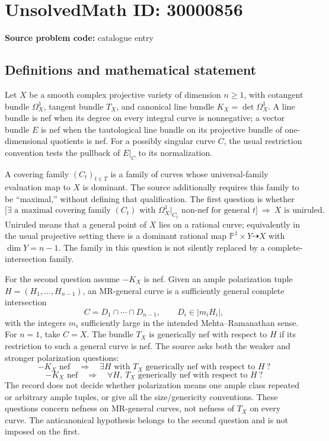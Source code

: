 \documentclass[11pt]{article}
\newcommand{\PP}{\mathbb{P}}
\begin{document}
\section*{UnsolvedMath ID: 30000856}
\textbf{Source problem code:} catalogue entry
\subsection{Definitions and mathematical statement}
Let \(X\) be a smooth complex projective variety of dimension \(n\geq1\), with cotangent bundle \(\Omega_X^1\), tangent bundle \(T_X\), and canonical line bundle \(K_X=\det\Omega_X^1\). A line bundle is nef when its degree on every integral curve is nonnegative; a vector bundle \(E\) is nef when the tautological line bundle on its projective bundle of one-dimensional quotients is nef. For a possibly singular curve \(C\), the usual restriction convention tests the pullback of \(E|_C\) to its normalization.

A covering family \((C_t)_{t\in T}\) is a family of curves whose universal-family evaluation map to \(X\) is dominant. The source additionally requires this family to be ``maximal,'' without defining that qualification. The first question is whether
\[
 \bigl[\exists\text{ a maximal covering family }(C_t)
     \text{ with }\Omega_X^1|_{C_t}\text{ non-nef for general }t\bigr]
 \ \Longrightarrow\ X\text{ is uniruled}.
\]
Uniruled means that a general point of \(X\) lies on a rational curve; equivalently in the usual projective setting there is a dominant rational map \(\PP^1\times Y\dashrightarrow X\) with \(\dim Y=n-1\). The family in this question is not silently replaced by a complete-intersection family.

For the second question assume \(-K_X\) is nef. Given an ample polarization tuple \(H=(H_1,\ldots,H_{n-1})\), an MR-general curve is a sufficiently general complete intersection
\[
 C=D_1\cap\cdots\cap D_{n-1},\qquad
 D_i\in|m_iH_i|,
\]
with the integers \(m_i\) sufficiently large in the intended Mehta--Ramanathan sense. For \(n=1\), take \(C=X\). The bundle \(T_X\) is generically nef with respect to \(H\) if its restriction to such a general curve is nef. The source asks both the weaker and stronger polarization questions:
\[
 -K_X\text{ nef}\quad\Longrightarrow\quad
 \exists H\text{ with }T_X\text{ generically nef with respect to }H\ ?
\]
\[
 -K_X\text{ nef}\quad\Longrightarrow\quad
 \forall H,\ T_X\text{ generically nef with respect to }H\ ?
\]
The record does not decide whether polarization means one ample class repeated or arbitrary ample tuples, or give all the size/genericity conventions. These questions concern nefness on MR-general curves, not nefness of \(T_X\) on every curve. The anticanonical hypothesis belongs to the second question and is not imposed on the first.
\end{document}
